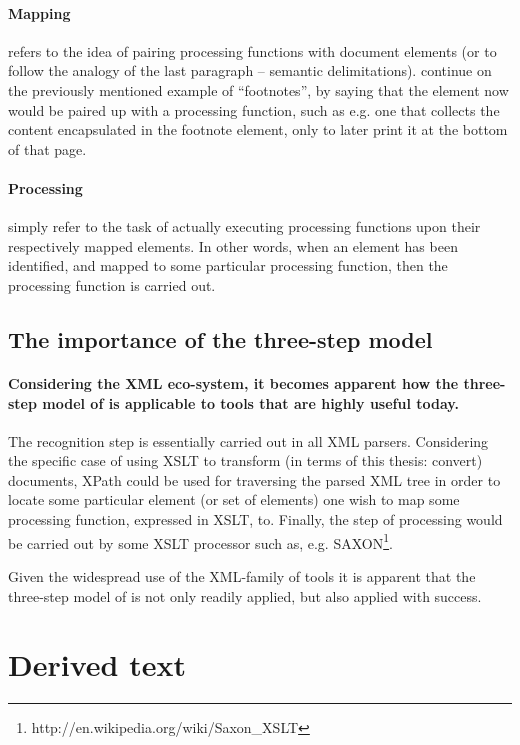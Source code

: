 \documentclass{scrreprt}
\begin{document}
\paragraph{Mapping} refers to the idea of pairing processing functions with document elements (or to follow the analogy of the last paragraph -- semantic delimitations). \citet{goldfarb} continue on the previously mentioned example of ``footnotes'', by saying that the element now would be paired up with a processing function, such as e.g. one that collects the content encapsulated in the footnote element, only to later print it at the bottom of that page.

\paragraph{Processing} simply refer to the task of actually executing processing functions upon their respectively mapped elements. In other words, when an element has been identified, and mapped to some particular processing function, then the processing function is carried out.



\subsection{The importance of the three-step model}
\paragraph{Considering the XML eco-system, it becomes apparent how the three-step model of \citet{goldfarb} is applicable to tools that are highly useful today.} The recognition step is essentially carried out in all XML parsers. Considering the specific case of using XSLT to transform (in terms of this thesis: convert) documents, XPath could be used for traversing the parsed XML tree in order to locate some particular element (or set of elements) one wish to map some processing function, expressed in XSLT, to. Finally, the step of processing would be carried out by some XSLT processor such as, e.g. SAXON\footnote{http://en.wikipedia.org/wiki/Saxon\_XSLT}.

Given the widespread use of the XML-family of tools it is apparent that the three-step model of \citet{goldfarb} is not only readily applied, but also applied with success.





\section{Derived text}
\label{sec:theory:derived-text}
\end{document}

